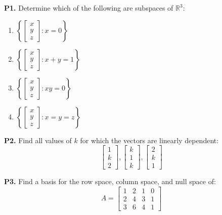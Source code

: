 \documentclass[12pt,a4paper]{article}
\theoremstyle{definition}
\begin{document}
\textbf{P1.} Determine which of the following are subspaces of $\mathbb{R}^3$:
\begin{enumerate}[label=(\alph*)]
    \item $\left\{\begin{bmatrix} x \\ y \\ z \end{bmatrix} : x = 0\right\}$
    \item $\left\{\begin{bmatrix} x \\ y \\ z \end{bmatrix} : x + y = 1\right\}$
    \item $\left\{\begin{bmatrix} x \\ y \\ z \end{bmatrix} : xy = 0\right\}$
    \item $\left\{\begin{bmatrix} x \\ y \\ z \end{bmatrix} : x = y = z\right\}$
\end{enumerate}

\textbf{P2.} Find all values of $k$ for which the vectors are linearly dependent:
\begin{equation}
\begin{bmatrix} 1 \\ k \\ 2 \end{bmatrix}, \begin{bmatrix} k \\ 1 \\ k \end{bmatrix}, \begin{bmatrix} 2 \\ k \\ 1 \end{bmatrix}
\end{equation}

\textbf{P3.} Find a basis for the row space, column space, and null space of:
\begin{equation}
A = \begin{bmatrix} 1 & 2 & 1 & 0 \\ 2 & 4 & 3 & 1 \\ 3 & 6 & 4 & 1 \end{bmatrix}
\end{equation}
\end{document}
